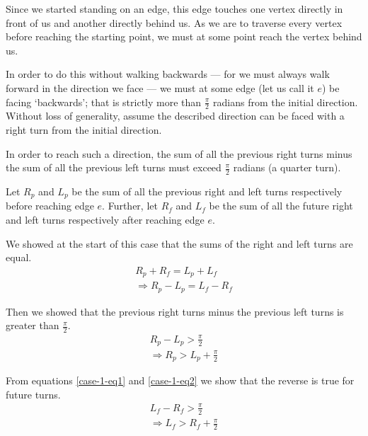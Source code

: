 \documentclass{article}
\begin{document}
Since we started standing on an edge, this edge touches one vertex directly in front of us and another directly behind us. As we are to traverse every vertex before reaching the starting point, we must at some point reach the vertex behind us.

In order to do this without walking backwards --- for we must always walk forward in the direction we face --- we must at some edge (let us call it \(e\)) be facing `backwards'; that is strictly more than \(\frac{\pi}{2}\) radians from the initial direction. Without loss of generality, assume the described direction can be faced with a right turn from the initial direction.

In order to reach such a direction, the sum of all the previous right turns minus the sum of all the previous left turns must exceed \(\frac{\pi}{2}\) radians (a quarter turn).

Let \(R_p\) and \(L_p\) be the sum of all the previous right and left turns respectively before reaching edge \(e\). Further, let \(R_f\) and \(L_f\) be the sum of all the future right and left turns respectively after reaching edge \(e\).

We showed at the start of this case that the sums of the right and left turns are equal.
\begin{gather}
	R_p + R_f = L_p + L_f \\
	\Rightarrow R_p - L_p = L_f - R_f \label{case-1-eq1}
\end{gather}

Then we showed that the previous right turns minus the previous left turns is greater than \(\frac{\pi}{2}\).
\begin{gather}
	R_p - L_p > \frac{\pi}{2} \label{case-1-eq2} \\
	\Rightarrow R_p > L_p + \frac{\pi}{2}
\end{gather}

From equations \ref{case-1-eq1} and \ref{case-1-eq2} we show that the reverse is true for future turns.
\begin{gather}
	L_f - R_f > \frac{\pi}{2} \\
	\Rightarrow L_f > R_f + \frac{\pi}{2}
\end{gather}
\end{document}
